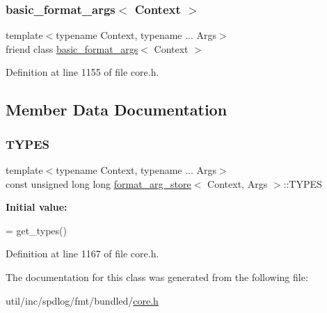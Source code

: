 \subsubsection{\texorpdfstring{basic\+\_\+format\+\_\+args$<$ Context $>$}{basic\_format\_args< Context >}}
{\footnotesize\ttfamily template$<$typename Context, typename ... Args$>$ \\
friend class \hyperlink{classbasic__format__args}{basic\+\_\+format\+\_\+args}$<$ Context $>$\hspace{0.3cm}{\ttfamily [friend]}}



Definition at line 1155 of file core.\+h.



\subsection{Member Data Documentation}
\mbox{\label{classformat__arg__store_a36570336ba52d8ae52c67b0492d4463c}} 
\subsubsection{\texorpdfstring{T\+Y\+P\+ES}{TYPES}}
{\footnotesize\ttfamily template$<$typename Context, typename ... Args$>$ \\
const unsigned long long \hyperlink{classformat__arg__store}{format\+\_\+arg\+\_\+store}$<$ Context, Args $>$\+::T\+Y\+P\+ES\hspace{0.3cm}{\ttfamily [static]}}

{\bfseries Initial value\+:}
\begin{DoxyCode}
=
    get\_types()
\end{DoxyCode}


Definition at line 1167 of file core.\+h.



The documentation for this class was generated from the following file\+:\begin{DoxyCompactItemize}
\item 
util/inc/spdlog/fmt/bundled/\hyperlink{core_8h}{core.\+h}\end{DoxyCompactItemize}
